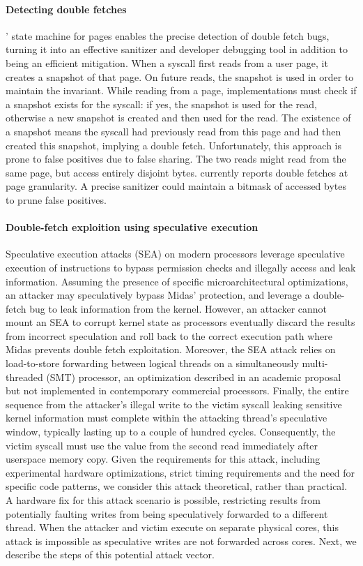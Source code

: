 \paragraph{Detecting double fetches}
\midas' state machine for pages enables the precise detection of double fetch
bugs, turning it into an effective sanitizer and developer debugging tool in
addition to being an efficient mitigation.
When a syscall first reads from a user page, it creates a snapshot
of that page.
On future reads, the snapshot is used in order to maintain the
invariant.
While reading from a page, implementations must check
if a snapshot exists for the syscall: if yes, the snapshot is used
for the read, otherwise a new snapshot is created and then used
for the read.
The existence of a snapshot means the syscall had previously
read from this page and had then created this snapshot, implying a double
fetch.
Unfortunately, this approach is prone to false positives due to false sharing.
The two reads might read from the same page, but access entirely
disjoint bytes.
\midas currently reports double fetches at page granularity.
A precise sanitizer could maintain a bitmask of accessed bytes to
prune false positives.

\paragraph{Double-fetch exploition using speculative execution}
Speculative execution attacks (SEA) on modern processors leverage speculative
execution of instructions to bypass permission checks and illegally access and
leak information.
Assuming the presence of specific microarchitectural optimizations, an attacker
may speculatively bypass Midas' protection, and leverage a double-fetch bug to
leak information from the kernel.
However, an attacker cannot mount an SEA to corrupt kernel state as processors
eventually discard the results from incorrect speculation and roll back to
the correct execution path where Midas prevents double fetch exploitation.
Moreover, the SEA attack relies on load-to-store forwarding between logical
threads on a simultaneously multi-threaded (SMT) processor, an optimization
described in an academic proposal~\cite{HiltonR10} but not implemented in 
contemporary commercial processors.
Finally, the entire sequence from the attacker's illegal write to the victim
syscall leaking sensitive kernel information must complete within the attacking
thread's speculative window, typically lasting up to a couple of hundred cycles.
Consequently, the victim syscall must use the value from the second read 
immediately after userspace memory copy.
Given the requirements for this attack, including experimental hardware 
optimizations, strict timing requirements and the need for specific code patterns,
we consider this attack theoretical, rather than practical.
A hardware fix for this attack scenario is possible, restricting results from
potentially faulting writes from being speculatively forwarded to a different thread.
When the attacker and victim execute on separate physical cores, this attack
is impossible as speculative writes are not forwarded across cores.
Next, we describe the steps of this potential attack vector.

